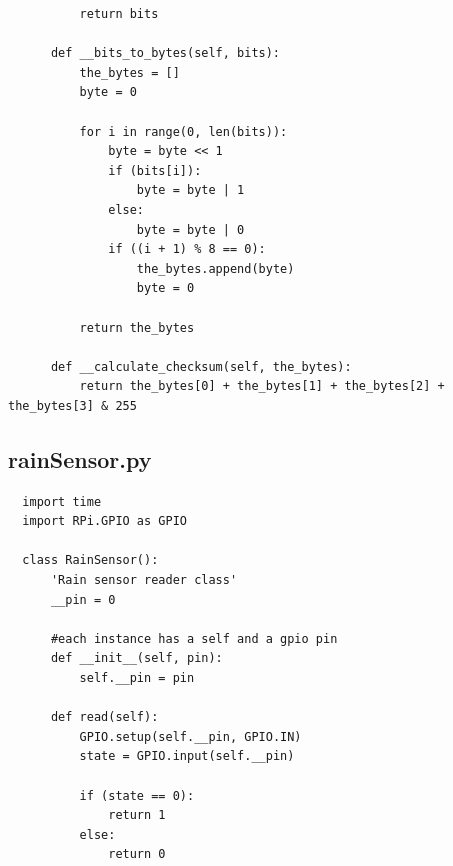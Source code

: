 \documentclass[10pt,a4paper]{article}
\begin{document}
\begin{verbatim}
          return bits

      def __bits_to_bytes(self, bits):
          the_bytes = []
          byte = 0

          for i in range(0, len(bits)):
              byte = byte << 1
              if (bits[i]):
                  byte = byte | 1
              else:
                  byte = byte | 0
              if ((i + 1) % 8 == 0):
                  the_bytes.append(byte)
                  byte = 0

          return the_bytes

      def __calculate_checksum(self, the_bytes):
          return the_bytes[0] + the_bytes[1] + the_bytes[2] + the_bytes[3] & 255
\end{verbatim}

\subsection{rainSensor.py}
\begin{verbatim}
  import time
  import RPi.GPIO as GPIO

  class RainSensor():
      'Rain sensor reader class'    
      __pin = 0

      #each instance has a self and a gpio pin
      def __init__(self, pin):
          self.__pin = pin
      
      def read(self):
          GPIO.setup(self.__pin, GPIO.IN)
          state = GPIO.input(self.__pin)
          
          if (state == 0):
              return 1
          else:
              return 0
\end{verbatim}
\end{document}
